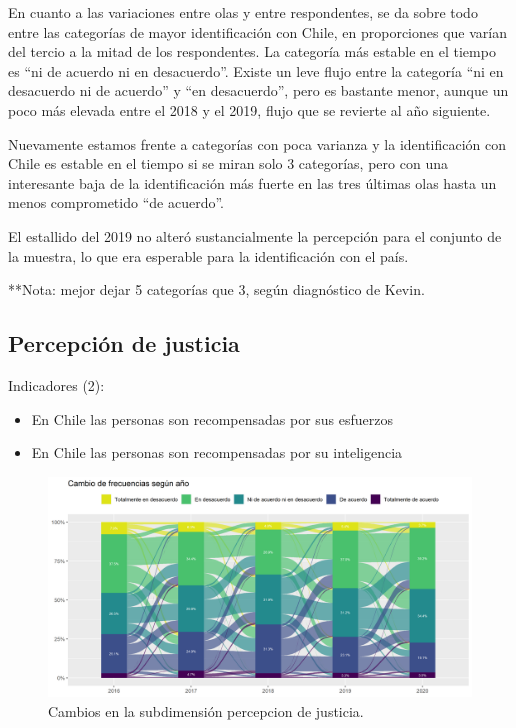 \documentclass[
  12pt,
]{book}
\begin{document}
En cuanto a las variaciones entre olas y entre respondentes, se da sobre todo entre las categorías de mayor identificación con Chile, en proporciones que varían del tercio a la mitad de los respondentes. La categoría más estable en el tiempo es ``ni de acuerdo ni en desacuerdo''. Existe un leve flujo entre la categoría ``ni en desacuerdo ni de acuerdo'' y ``en desacuerdo'', pero es bastante menor, aunque un poco más elevada entre el 2018 y el 2019, flujo que se revierte al año siguiente.

Nuevamente estamos frente a categorías con poca varianza y la identificación con Chile es estable en el tiempo si se miran solo 3 categorías, pero con una interesante baja de la identificación más fuerte en las tres últimas olas hasta un menos comprometido ``de acuerdo''.

El estallido del 2019 no alteró sustancialmente la percepción para el conjunto de la muestra, lo que era esperable para la identificación con el país.

**Nota: mejor dejar 5 categorías que 3, según diagnóstico de Kevin.

\hypertarget{percepciuxf3n-de-justicia}{%
\subsection{Percepción de justicia}\label{percepciuxf3n-de-justicia}}

Indicadores (2):

\begin{itemize}
\item
  En Chile las personas son recompensadas por sus esfuerzos
\item
  En Chile las personas son recompensadas por su inteligencia
\end{itemize}

\begin{figure}[H]

{\centering \includegraphics[width=1\linewidth,height=1\textheight]{output/graphs/alluvial_justicia} 

}

\caption{Cambios en la subdimensión percepcion de justicia.}\label{fig:alluvial-justicia}
\end{figure}
\end{document}
